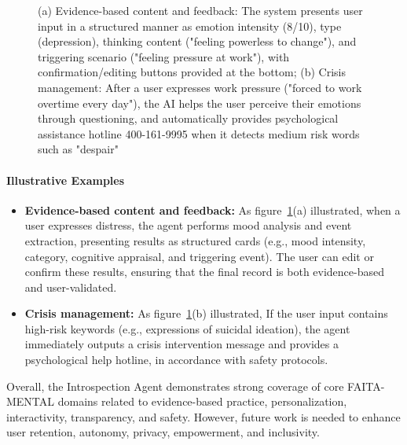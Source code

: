 \begin{figure}[h!]
  \caption{
(a) Evidence-based content and feedback: The system presents user input in a structured manner as emotion intensity (8/10), type (depression), thinking content ("feeling powerless to change"), and triggering scenario ("feeling pressure at work"), with confirmation/editing buttons provided at the bottom; 
(b) Crisis management: After a user expresses work pressure ("forced to work overtime every day"), the AI helps the user perceive their emotions through questioning, and automatically provides psychological assistance hotline 400-161-9995 when it detects medium risk words such as "despair"
}
  \label{fig:illustrative-examples}
\end{figure}

\paragraph{Illustrative Examples}

\begin{itemize}
    \item \textbf{Evidence-based content and feedback:} As figure~\ref{fig:illustrative-examples}(a) illustrated, when a user expresses distress, the agent performs mood analysis and event extraction, presenting results as structured cards (e.g., mood intensity, category, cognitive appraisal, and triggering event). The user can edit or confirm these results, ensuring that the final record is both evidence-based and user-validated.
    \item \textbf{Crisis management:} As figure~\ref{fig:illustrative-examples}(b) illustrated, If the user input contains high-risk keywords (e.g., expressions of suicidal ideation), the agent immediately outputs a crisis intervention message and provides a psychological help hotline, in accordance with safety protocols.
\end{itemize}

Overall, the Introspection Agent demonstrates strong coverage of core FAITA-MENTAL domains related to evidence-based practice, personalization, interactivity, transparency, and safety. However, future work is needed to enhance user retention, autonomy, privacy, empowerment, and inclusivity.

